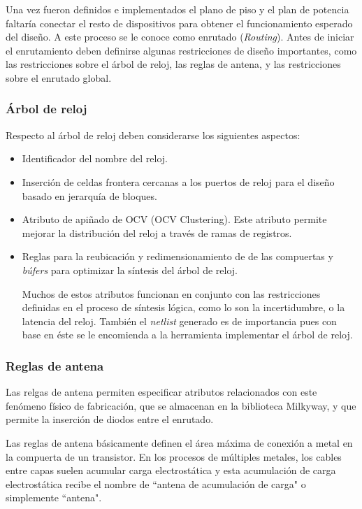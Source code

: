 Una vez fueron definidos e implementados el plano de piso y el plan de potencia faltaría conectar el resto de dispositivos para obtener el funcionamiento esperado del diseño. A este proceso se le conoce como enrutado (\textit{Routing}). Antes de iniciar el enrutamiento deben definirse algunas restricciones de diseño importantes, como las restricciones sobre el árbol de reloj, las reglas de antena, y las restricciones sobre el enrutado global.

\subsubsection*{Árbol de reloj}

Respecto al árbol de reloj deben considerarse los siguientes aspectos:

\begin{itemize}
\item Identificador del nombre del reloj.
\item Inserción de celdas frontera cercanas a los puertos de reloj para el diseño basado en jerarquía de bloques.
\item Atributo de apiñado de OCV (OCV Clustering). Este atributo permite mejorar la distribución del reloj a través de ramas de registros.
\item Reglas para la reubicación y redimensionamiento de de las compuertas y \textit{búfers} para optimizar la síntesis del árbol de reloj.

Muchos de estos atributos funcionan en conjunto con las restricciones definidas en el proceso de síntesis lógica, como lo son la incertidumbre, o la latencia del reloj. También el \textit{netlist} generado es de importancia pues con base en éste se le encomienda a la herramienta implementar el árbol de reloj.
\end{itemize}

\subsubsection*{Reglas de antena}

Las relgas de antena permiten especificar atributos relacionados con este fenómeno físico de fabricación, que se almacenan en la biblioteca Milkyway, y que permite la inserción de diodos entre el enrutado.

Las reglas de antena básicamente definen el área máxima de conexión a metal en la compuerta de un transistor. En los procesos de múltiples metales, los cables entre capas suelen acumular carga electrostática y esta acumulación de carga electrostática recibe el nombre de ``antena de acumulación de carga" o simplemente ``antena".

